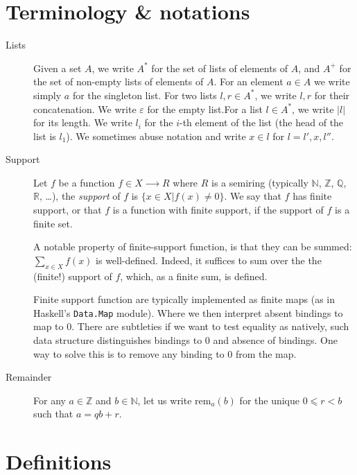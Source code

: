 \documentclass{article}
\newcommand{\lists}[1]{{#1}^*}
\newcommand{\nelists}[1]{{#1}^+}
\newcommand{\emptylist}{ε}
\newcommand{\pos}[2]{{#2}_{#1}}
\newcommand{\length}[1]{|#1|}
\newcommand{\rem}[2]{\mathrm{rem}_{#1}(#2)}
\begin{document}
\section{Terminology \& notations}
\label{sec:notations}

\begin{description}
\item[Lists] Given a set $A$, we write $\lists{A}$ for the set of lists of
  elements of $A$, and $\nelists{A}$ for the set of non-empty lists of elements
  of $A$. For an element $a∈A$ we write simply $a$ for the singleton list. For
  two lists $l,r∈\lists{A}$, we write $l,r$ for their concatenation. We write
  $\emptylist$ for the empty list.For a list $l∈\lists{A}$, we write
  $\length{l}$ for its length. We write $\pos{i}{l}$ for the $i$-th element of
  the list (the head of the list is $\pos{1}{l}$). We sometimes abuse notation
  and write $x∈l$ for $l = l',x,l''$.

\item[Support] Let $f$ be a function $f∈X⟶R$ where $R$ is a semiring
  (typically $ℕ$, $ℤ$, $ℚ$, $ℝ$, …), the \emph{support} of $f$ is
  $\{ x∈X | f(x)≠0 \}$. We say that $f$ has finite support, or that
  $f$ is a function with finite support, if the support of $f$ is
  a finite set.

  A notable property of finite-support function, is that they can be
  summed: $∑_{x∈X}f(x)$ is well-defined. Indeed, it suffices to sum
  over the the (finite!) support of $f$, which, as a finite sum, is
  defined.

  Finite support function are typically implemented as finite maps (as
  in Haskell's \verb+Data.Map+ module). Where we then interpret absent
  bindings to map to $0$. There are subtleties if we want to test
  equality as natively, such data structure distinguishes bindings to
  $0$ and absence of bindings. One way to solve this is to remove any
  binding to $0$ from the map.

\item[Remainder] For any $a∈ℤ$ and $b∈ℕ$, let us write $\rem{a}{b}$
  for the unique $0⩽r<b$ such that $a=qb+r$.
\end{description}

\section{Definitions}
\label{sec:definitions}
\end{document}
